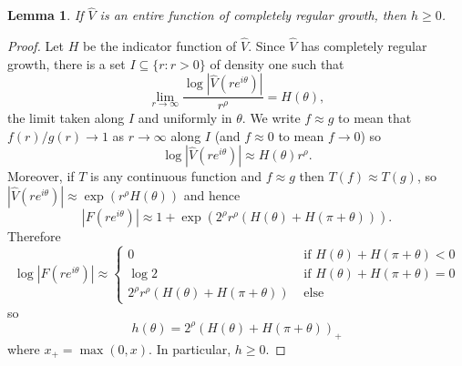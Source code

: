 \documentclass[reqno,12pt,letterpaper]{amsart}
\newtheorem{lemma}[theorem]{Lemma}
\theoremstyle{definition}
\begin{document}
\begin{lemma}
\label{no trigonometric indicators}
If $\widehat V$ is an entire function of completely regular growth, then $h \geq 0$.
\end{lemma}
\begin{proof}
Let $H$ be the indicator function of $\widehat V$.
Since $\widehat V$ has completely regular growth, there is a set $I \subseteq \{r: r > 0\}$ of density one such that
$$\lim_{r \to \infty} \frac{\log|\widehat V(re^{i\theta})|}{r^\rho} = H(\theta),$$
the limit taken along $I$ and uniformly in $\theta$.
We write $f \approx g$ to mean that $f(r)/g(r) \to 1$ as $r \to \infty$ along $I$ (and $f \approx 0$ to mean $f \to 0$) so
$$\log |\widehat V(re^{i\theta})| \approx H(\theta)r^\rho.$$
Moreover, if $T$ is any continuous function and $f \approx g$ then $T(f) \approx T(g)$, so $|\widehat V(re^{i\theta})| \approx \exp(r^\rho H(\theta))$ and hence
$$|F(re^{i\theta})| \approx 1 + \exp(2^\rho r^\rho(H(\theta) + H(\pi + \theta))).$$
Therefore
$$\log |F(re^{i\theta})| \approx \begin{cases}
0 &\text{ if $H(\theta) + H(\pi + \theta) < 0$}\\
\log 2 &\text{ if $H(\theta) + H(\pi + \theta) = 0$}\\
2^\rho r^\rho (H(\theta) + H(\pi + \theta)) &\text{ else}
\end{cases}$$
so
$$h(\theta) = 2^\rho (H(\theta) + H(\pi + \theta))_+$$
where $x_+ = \max(0, x)$. In particular, $h \geq 0$.
\end{proof}
\end{document}
